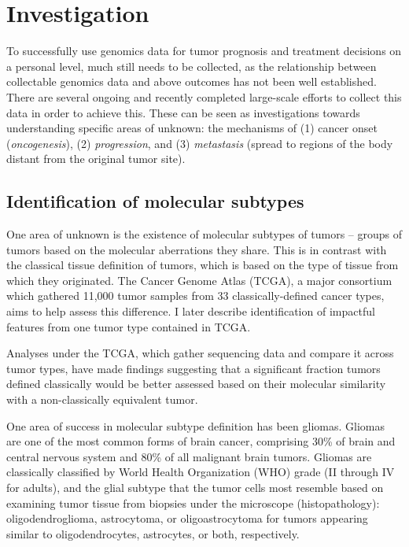 \section{Investigation}
	To successfully use genomics data for tumor prognosis and treatment
        decisions on a personal level, much still needs to be
       collected, as the relationship between collectable genomics data and 
       above outcomes has not been well established. There  are several ongoing and recently completed large-scale efforts to collect this data in order to achieve this. These can be
        seen as investigations towards understanding specific areas of
        unknown: the mechanisms of (1) cancer onset (\textit{oncogenesis}),
        (2) \textit{progression}, and (3) \textit{metastasis} (spread to regions of
        the body distant from the original tumor site).


        \subsection{Identification of molecular subtypes}

	One area of unknown is the existence of molecular subtypes of
        tumors – groups of tumors based on the molecular aberrations
        they share. This is in contrast with the classical tissue
        definition of tumors, which is based on the type of tissue
        from which they originated. The Cancer Genome Atlas (TCGA)\cite{mclendon_comprehensive_2008}, a
        major consortium which gathered 11,000 tumor samples from 33
        classically-defined cancer types, aims to help assess this
        difference. I later describe identification of impactful
        features from one tumor type contained in TCGA. 
        
        Analyses under the TCGA, which gather sequencing data and compare it
        across tumor types, have made findings suggesting that
        a significant fraction tumors defined classically would be
        better assessed based on their molecular similarity with a
        non-classically equivalent tumor.

        One area of success in molecular subtype definition has been
        gliomas. Gliomas are one of the most common forms of brain
        cancer, comprising 30\% of brain and central nervous system
        and 80\% of all malignant brain tumors. Gliomas are
        classically classified by World Health Organization (WHO)
        grade (II through IV for adults), and the glial subtype that
        the tumor cells most resemble based on examining tumor tissue
        from biopsies under the microscope (histopathology):
        oligodendroglioma, astrocytoma, or oligoastrocytoma for tumors
        appearing similar to oligodendrocytes, astrocytes, or both,
        respectively. 
        

